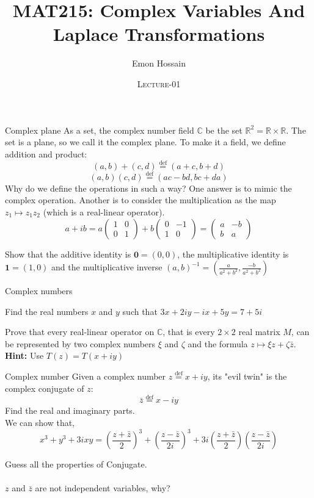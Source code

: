 \documentclass[11pt]{beamer}
\author[] %
{Emon Hossain\inst{1}}
\institute[University of Dhaka] %
{
  \inst{1}%
  Lecturer\\MNS department\\Brac University
}
\date[] %
{\textsc{Lecture-01}}
\title[]{MAT215: Complex Variables And Laplace Transformations}
\theoremstyle{plain}
\begin{document}
\begin{frame}
\titlepage
\end{frame}

\begin{frame}{Complex plane}
    As a set, the complex number field $\mathbb C$ be the set $\mathbb R^2=\mathbb R\times\mathbb R$. The set is a plane, so we call it the complex plane. To make it a field, we define addition and product:
    $$
    (a,b)+(c,d)\stackrel{\operatorname{def}}{=}(a+c,b+d)
    $$
    $$
    (a,b)(c,d)\stackrel{\operatorname{def}}{=}(ac-bd,bc+da)
    $$
    Why do we define the operations in such a way? One answer is to mimic the complex operation. Another is to consider the multiplication as the map $z_1\mapsto z_1z_2$ (which is a real-linear operator). $$a+ib=a\begin{pmatrix}
        1&0\\0&1
    \end{pmatrix}+b\begin{pmatrix}
        0&-1\\1&0
    \end{pmatrix}=\begin{pmatrix}
        a&-b\\b&a
    \end{pmatrix}$$
    \begin{problem}
        Show that the additive identity is $\mathbf 0=(0,0)$, the multiplicative identity is $\mathbf 1=(1,0)$ and the multiplicative inverse $(a,b)^{-1}=\left(\frac{a}{a^2+b^2},\frac{-b}{a^2+b^2}\right)$ 
    \end{problem}
\end{frame}
\begin{frame}{Complex numbers}
    \begin{problem}
        Find the real numbers $x$ and $y$ such that $3x+2iy-ix+5y=7+5i$
    \end{problem}
    \begin{problem}
        Prove that every real-linear operator on $\mathbb C$, that is every $2\times 2$ real matrix $M$, can be represented by two complex numbers $\xi$ and $\zeta$ and the formula $z\mapsto \xi z+\zeta\bar z$.\\
        \textbf{Hint:} Use $T(z)=T(x+iy)$
    \end{problem}
\end{frame}
\begin{frame}{Complex number}
    Given a complex number $z\stackrel{\operatorname{def}}{=}x+iy$, its "evil twin" is the complex conjugate of $z$: $$\bar z\stackrel{\operatorname{def}}{=}x-iy$$
    Find the real and imaginary parts.\\
    We can show that, $$x^3+y^3+3ixy=\left(\frac{z+\bar z}{2}\right)^3+\left(\frac{z-\bar z}{2i}\right)^3+3i\left(\frac{z+\bar z}{2}\right)\left(\frac{z-\bar z}{2i}\right)$$
    \begin{problem}
        Guess all the properties of Conjugate.\\~\\
        $z$ and $\bar z$ are not independent variables, why? 
    \end{problem}
\end{frame}
\end{document}
